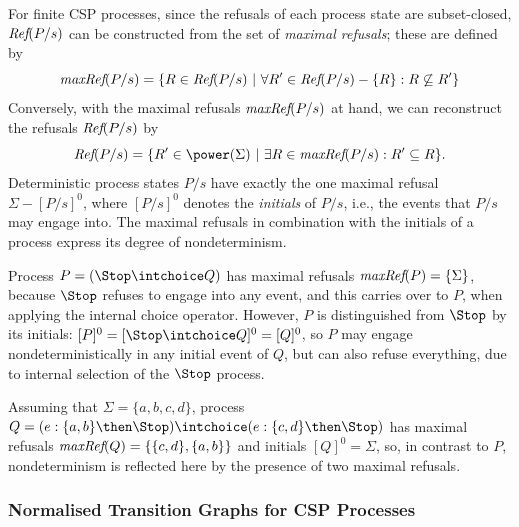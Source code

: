 For finite CSP processes, since the refusals of each process state are
subset-closed, $\text{\it Ref}(P/s)$ can be
constructed from the set of \emph{maximal refusals}; these are defined by 
%
\begin{equation}
\text{\it maxRef}(P/s) = \{ R \in\text{\it Ref}(P/s)~|~\forall R'\in \text{\it Ref}(P/s) - \{ R\}: R \not\subseteq R'\}
\end{equation}
%
Conversely, with the maximal refusals $\text{\it maxRef}(P/s)$ at hand, we can
reconstruct the refusals $\text{\it Ref}(P/s)$ by  
%
\begin{equation}
\refs(P/s) = \{ R'\in\power(\Sigma)~|~\exists R\in \maxrefs(P/s): R'\subseteq R \}.
\end{equation}
%
Deterministic process states $P/s$ have exactly the one maximal refusal
$\Sigma-[P/s]^0$, where $[P/s]^0$ denotes the \emph{initials} of $P/s$, i.e.,   the events that $P/s$ may engage into.
The maximal refusals in combination with the initials of a process express its degree of 
nondeterminism.
\begin{example}
\label{ex:nondetdegree}
Process $P = (\Stop \intchoice Q)$ has maximal refusals 
$\text{\it maxRef}(P) = \{ \Sigma \}$, because $\Stop$ 
refuses to engage into any event, and this carries over to $P$, when applying the internal 
choice operator. However, $P$ is distinguished from $\Stop$ by its initials: 
$[P]^0 = [ \Stop \intchoice Q]^0 = [Q]^0$, so $P$ may engage nondeterministically in
any initial event of $Q$, but can also refuse everything, due to internal selection of the $\Stop$ process.

Assuming that $\Sigma = \{a,b,c,d\}$, process
$Q = (e:\{a,b\} \then \Stop) \intchoice (e:\{c,d\} \then \Stop)$ has maximal refusals
$\text{\it maxRef}(Q) = \{ \{c,d\}, \{a,b\} \}$ and initials $[Q]^0=\Sigma$, so, in contrast to
$P$, nondeterminism is reflected
here by the presence of two maximal refusals.
\xbox
\end{example}

 

\subsubsection*{Normalised Transition Graphs for CSP Processes}
\label{sec:ntg}

